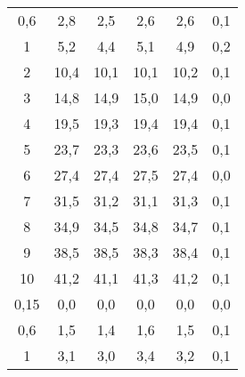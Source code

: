 \begin{table}[htp]
\begin{center}
\begin{tabular}{c|ccc|cc}
			0,6           &          2,8          &          2,5          &          2,6          &            2,6            &            0,1             \\
			1            &          5,2          &          4,4          &          5,1          &            4,9            &            0,2             \\
			2            &         10,4          &         10,1          &         10,1          &           10,2            &            0,1             \\
			3            &         14,8          &         14,9          &         15,0          &           14,9            &            0,0             \\
			4            &         19,5          &         19,3          &         19,4          &           19,4            &            0,1             \\
			5            &         23,7          &         23,3          &         23,6          &           23,5            &            0,1             \\
			6            &         27,4          &         27,4          &         27,5          &           27,4            &            0,0             \\
			7            &         31,5          &         31,2          &         31,1          &           31,3            &            0,1             \\
			8            &         34,9          &         34,5          &         34,8          &           34,7            &            0,1             \\
			9            &         38,5          &         38,5          &         38,3          &           38,4            &            0,1             \\
			10            &         41,2          &         41,1          &         41,3          &           41,2            &            0,1             \\ \hline
			0,15           &          0,0          &          0,0          &          0,0          &            0,0            &            0,0             \\
			0,6           &          1,5          &          1,4          &          1,6          &            1,5            &            0,1             \\
			1            &          3,1          &          3,0          &          3,4          &            3,2            &            0,1             \\

\end{tabular}
\end{center}
\end{table}
